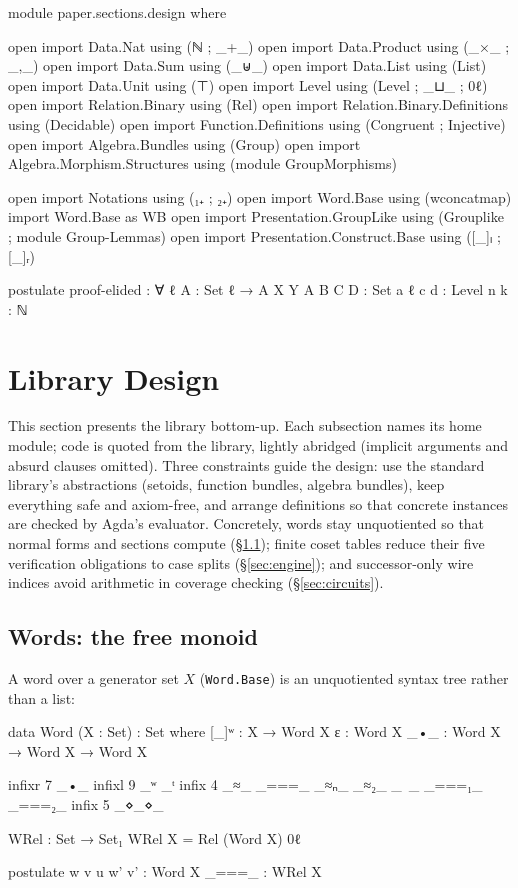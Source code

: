 \begin{code}[hide]
module paper.sections.design where

open import Data.Nat using (ℕ ; _+_)
open import Data.Product using (_×_ ; _,_)
open import Data.Sum using (_⊎_)
open import Data.List using (List)
open import Data.Unit using (⊤)
open import Level using (Level ; _⊔_ ; 0ℓ)
open import Relation.Binary using (Rel)
open import Relation.Binary.Definitions using (Decidable)
open import Function.Definitions using (Congruent ; Injective)
open import Algebra.Bundles using (Group)
open import Algebra.Morphism.Structures using (module GroupMorphisms)

open import Notations using (₁₊ ; ₂₊)
open import Word.Base using (wconcatmap)
import Word.Base as WB
open import Presentation.GroupLike using (Grouplike ; module Group-Lemmas)
open import Presentation.Construct.Base using ([_]ₗ ; [_]ᵣ)

postulate
  proof-elided : ∀ {ℓ} {A : Set ℓ} → A
  X Y A B C D  : Set
  a ℓ c d      : Level
  n k          : ℕ
\end{code}
\section{Library Design}\label{sec:design}

This section presents the library bottom-up.  Each subsection names its
home module; code is quoted from the library, lightly abridged (implicit
arguments and absurd clauses omitted).  Three constraints guide the design:
use the standard library's abstractions (setoids, function bundles, algebra
bundles), keep everything safe and axiom-free, and arrange definitions so
that concrete instances are checked by Agda's evaluator.
Concretely, words stay unquotiented so that normal forms and sections
compute (\S\ref{sec:words}); finite coset tables reduce their five
verification obligations to case splits (\S\ref{sec:engine}); and
successor-only wire indices avoid arithmetic in coverage checking
(\S\ref{sec:circuits}).

\subsection{Words: the free monoid}\label{sec:words}

A word over a generator set $X$ (\texttt{Word.Base}) is an unquotiented
syntax tree rather than a list:

\begin{code}
data Word (X : Set) : Set where
  [_]ʷ : X → Word X
  ε    : Word X
  _•_  : Word X → Word X → Word X
\end{code}
\begin{code}[hide]
infixr 7 _•_
infixl 9 _ʷ _ᵗ
infix 4 _≈_ _===_ _≈ₙ_ _≈₂_ _~_ _===₁_ _===₂_
infix 5 _⋄_⋄_

WRel : Set → Set₁
WRel X = Rel (Word X) 0ℓ

postulate
  w v u w' v' : Word X
  _===_       : WRel X
\end{code}

